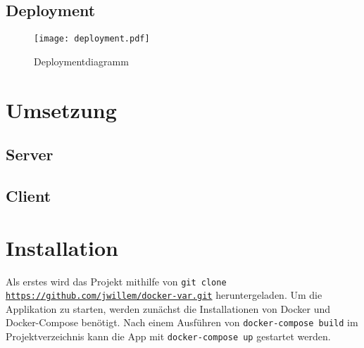 \subsection{Deployment}
  \begin{figure}
    \centering
    \texttt{[image: deployment.pdf]}
    \par
    \caption{Deploymentdiagramm}
    \label{fig:deployment}
  \end{figure}
\section{Umsetzung}
\subsection{Server}
\subsection{Client}
\section{Installation}
Als erstes wird das Projekt mithilfe von \texttt{git clone \url{https://github.com/jwillem/docker-var.git}} heruntergeladen.
Um die Applikation zu starten, werden zunächst die Installationen von Docker und Docker-Compose benötigt.
Nach einem Ausführen von \texttt{docker-compose build} im Projektverzeichnis kann die App mit \texttt{docker-compose up} gestartet werden.
